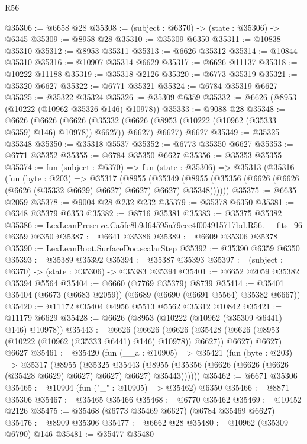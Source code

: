 \begin{lexlean}{R56}
\begin{coremodule}
@35306 := @6658 @28
@35308 := (subject : @6370) -> (state : @35306) -> @6345
@35309 := @8958 @28
@35310 := @35309 @6350
@35311 := @10838 @35310
@35312 := @8953 @35311
@35313 := @6626 @35312
@35314 := @10844 @35310
@35316 := @10907 @35314 @6629
@35317 := @6626 @11137
@35318 := @10222 @11188
@35319 := @35318 @2126
@35320 := @6773 @35319
@35321 := @35320 @6627
@35322 := @6771 @35321
@35324 := @6784 @35319 @6627
@35325 := @35322 @35324
@35326 := @35309 @6359
@35332 := @6626 (@8953 (@10222 (@10962 @35326 @146) @10978))
@35333 := @9088 @28
@35348 := @6626
    (@6626
      (@6626 (@35332 (@6626 (@8953 (@10222 (@10962 (@35333 @6359) @146) @10978)) @6627)) @6627)
      @6627)
    @6627
@35349 := @35325 @35348
@35350 := @35318 @5537
@35352 := @6773 @35350 @6627
@35353 := @6771 @35352
@35355 := @6784 @35350 @6627
@35356 := @35353 @35355
@35374 := fun (subject : @6370) =>
  fun (state : @35306) =>
  @35313
    (@35316
      (fun (byte : @203) =>
      @35317
        (@8955
          (@35349
            (@8955 (@35356 (@6626 (@6626 (@6626 (@35332 @6629) @6627) @6627) @6627) @35348))))))
@35375 := @6635 @2059
@35378 := @9004 @28 @232 @232
@35379 := @35378 @6350
@35381 := @6348 @35379 @6353
@35382 := @8716 @35381
@35383 := @35375 @35382
@35386 := LexLeanPreserve.Ca5fe8b9d64595a79eee4f004915717bd.R56.__fits_96 @6359 @6350
@35387 := @6641 @35386
@35389 := @6609 @35306 @35378
@35390 := LexLeanBoot.SurfaceDoc.scalarStep
@35392 := @35390 @6359 @6350
@35393 := @35389 @35392
@35394 := @35387 @35393
@35397 := (subject : @6370) -> (state : @35306) -> @35383 @35394
@35401 := @6652 @2059 @35382 @35394 @5564
@35404 := @6660 (@7769 @35379) @8739
@35414 := @35401 @35404 (@6673 (@6683 @2059)) (@6689 (@6690 (@6691 @5564) @35382 @6667))
@35420 := @11172 @35404 @4956 @5513 @5562 @35312 @10842
@35421 := @11179 @6629
@35428 := @6626 (@8953 (@10222 (@10962 (@35309 @6441) @146) @10978))
@35443 := @6626
    (@6626
      (@6626 (@35428 (@6626 (@8953 (@10222 (@10962 (@35333 @6441) @146) @10978)) @6627)) @6627)
      @6627)
    @6627
@35461 := @35420
    (fun (__a : @10905) =>
    @35421
      (fun (byte : @203) =>
      @35317
        (@8955
          (@35325
            @35443
            (@8955 (@35356 (@6626 (@6626 (@6626 (@35428 @6629) @6627) @6627) @6627) @35443))))))
@35462 := @6671 @35306
@35465 := @10904 (fun ("_" : @10905) => @35462) @6350
@35466 := @8871 @35306
@35467 := @35465 @35466
@35468 := @6770 @35462
@35469 := @10452 @2126
@35475 := @35468 (@6773 @35469 @6627) (@6784 @35469 @6627)
@35476 := @8909 @35306
@35477 := @6662 @28
@35480 := @10962 (@35309 @6790) @146
@35481 := @35477 @35480

\end{coremodule}
\end{lexlean}
